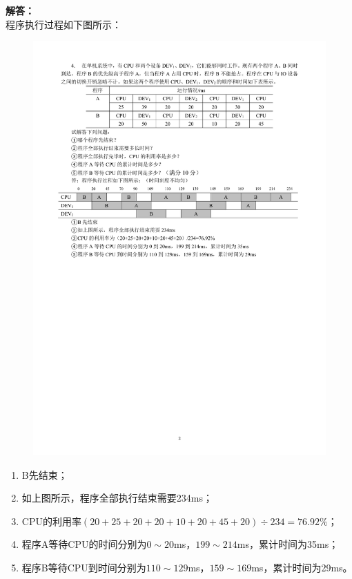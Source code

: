 \documentclass[10pt,a4paper,UTF8]{ctexart}
\newenvironment{solution}{\noindent\textbf{解答：}\\ \indent}{\par}
\begin{document}
\begin{solution}
	程序执行过程如下图所示：
	\begin{figure}[H]
		\centering
		\vspace{-0.5em}
		\includegraphics[width=\linewidth]{img/4.2.pdf}
		\vspace{-1em}
	\end{figure}
	\begin{enumerate}[label=(\arabic*)]
		\item B先结束；
		\item 如上图所示，程序全部执行结束需要234ms；
		\item CPU的利用率$(20+25+20+20+10+20+45+20)\div 234=76.92\%$；
		\item 程序A等待CPU的时间分别为$0\sim 20$ms，$199 \sim 214$ms，累计时间为35ms；
		\item 程序B等待CPU到时间分别为$110\sim 129$ms，$159\sim 169$ms，累计时间为29ms。
	\end{enumerate}
\end{solution}
\end{document}
